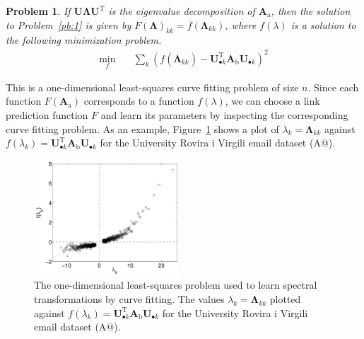 \documentclass[11pt,a4paper]{book}
\newtheorem{problem}{Problem}
\newcommand{\wTwo}{0.48}
\begin{document}
\begin{problem}
  If $\mathbf U\mathbf \Lambda \mathbf U^{\mathrm T}$ is the eigenvalue
  decomposition of $\mathbf A_{\mathrm a}$, then the solution to Problem~\ref{pb:1} is
  given by $F(\mathbf \Lambda)_{kk}=f(\mathbf \Lambda_{kk})$, where $f(\lambda)$
  is a solution to the following minimization problem.
  \begin{align}
    \min_f \quad & \sum_k \left(f(\mathbf \Lambda_{kk}^{\phantom{\mathrm
        I}}) - \mathbf 
    U^{\mathrm T}_{\bullet
      k}\mathbf A_{\mathrm b}^{\phantom{\mathrm I}}\mathbf U^{\phantom{\mathrm I}}_{\bullet
      k}\right)^2  \label{eq:curve-fitting} 
  \end{align}
\end{problem}
This is a one-dimensional least-squares curve fitting problem of size
$n$.
Since each function $F(\mathbf A_{\mathrm a})$ corresponds to a function
$f(\lambda)$, we can 
choose a link prediction function $F$ and learn its parameters
by inspecting the corresponding curve fitting problem.  
As an example, Figure~\ref{fig:curve-fitting-bare} shows a plot of
$\lambda_k = \mathbf \Lambda_{kk}^{\phantom{\mathrm I}}$ against
$f(\lambda_k) = \mathbf U^{\mathrm
  T}_{\bullet k}\mathbf A_{\mathrm b}^{\phantom{\mathrm I}}\mathbf
U^{\phantom{\mathrm I}}_{\bullet k}$ for the University Rovira
i Virgili email dataset (\textsf{A@}). 

\begin{figure}[h!]              
   \centering
   \includegraphics[width=\wTwo\textwidth]{img-st/curve-bare.symf.arenas-email.a} 
   \caption[
     The one-dimensional least-squares problem used to learn spectral
     transformations by curve fitting.
   ]{
     The one-dimensional least-squares problem used to learn spectral
     transformations by curve fitting.  The values $\lambda_k = \mathbf
     \Lambda_{kk}^{\phantom{\mathrm I}}$ plotted against $f(\lambda_k) =
     \mathbf U^{\mathrm T}_{\bullet k}\mathbf A_{\mathrm
       b}^{\phantom{\mathrm I}}\mathbf U^{\phantom{\mathrm I}}_{\bullet
       k}$ for the University Rovira i Virgili email dataset
     (\textsf{A@}).
   }
   \label{fig:curve-fitting-bare}
\end{figure}
\end{document}
